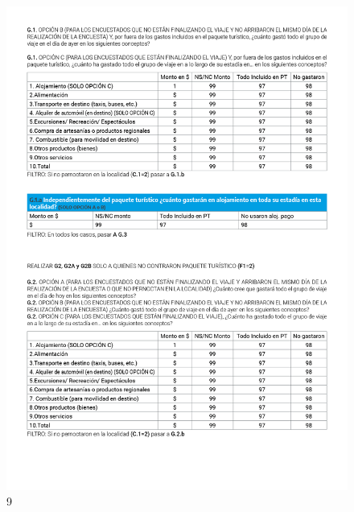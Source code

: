 \documentclass[
]{book}
\begin{document}
\begin{figure}
\includegraphics[width=17.22in]{imagenes/graf09} \caption{9}\label{fig:009}
\end{figure}
\end{document}
